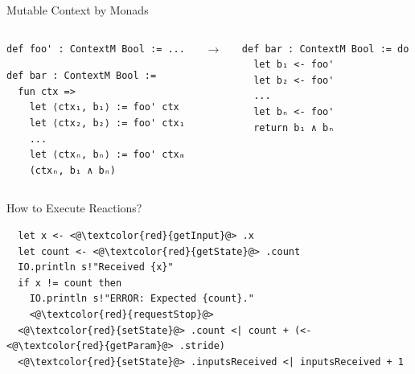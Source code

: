 \documentclass[aspectratio=169]{beamer}
\begin{document}
\begin{frame}[fragile]{Mutable Context by Monads}
\begin{columns}[onlytextwidth]  

\begin{column}{0.45\textwidth}  
\begin{lstlisting}
def foo' : ContextM Bool := ...
\end{lstlisting}

\begin{lstlisting}
def bar : ContextM Bool := 
  fun ctx =>
    let ⟨ctx₁, b₁⟩ := foo' ctx
    let ⟨ctx₂, b₂⟩ := foo' ctx₁
    ...
    let ⟨ctxₙ, bₙ⟩ := foo' ctxₘ
    (ctxₙ, b₁ ∧ bₙ)
\end{lstlisting}
\end{column}

\pause

\begin{column}{0.1\textwidth}
\begin{center}
$\to$
\end{center}
\end{column}

\begin{column}{0.4\textwidth}  

\vspace{5mm}  
\begin{lstlisting}
def bar : ContextM Bool := do
  let b₁ <- foo'
  let b₂ <- foo'
  ...
  let bₙ <- foo'
  return b₁ ∧ bₙ
\end{lstlisting}
\end{column}

\end{columns}  
\end{frame}


\begin{frame}[fragile]{How to Execute Reactions?}


\begin{lstlisting}
  let x <- <@\textcolor{red}{getInput}@> .x
  let count <- <@\textcolor{red}{getState}@> .count
  IO.println s!"Received {x}"  
  if x != count then
    IO.println s!"ERROR: Expected {count}."
    <@\textcolor{red}{requestStop}@>
  <@\textcolor{red}{setState}@> .count <| count + (<- <@\textcolor{red}{getParam}@> .stride)
  <@\textcolor{red}{setState}@> .inputsReceived <| inputsReceived + 1
\end{lstlisting}

\end{frame}
\end{document}
